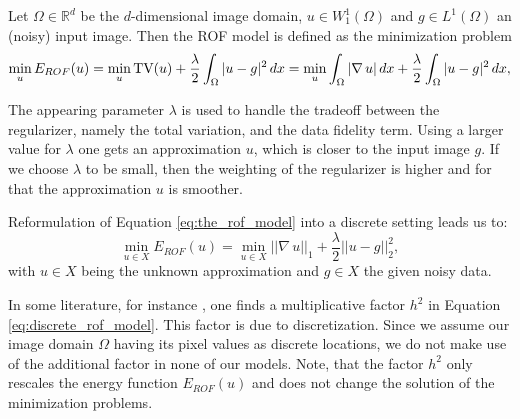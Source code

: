     \begin{definition} %
    \label{def:the_rof_model}

        Let $\Omega \in \mathbb{R}^{d}$ be the $d$-dimensional image domain, $u \in W_{1}^{1}(\Omega)$ and $g \in L^{1}(\Omega)$ an (noisy) input image. Then the ROF model is defined as the minimization problem
            \begin{equation}
                \min_{u} E_{ROF}(u) = \min_{u} \textnormal{TV}(u) + \frac{\lambda}{2} \int_{\Omega} |u - g|^{2} \, dx = \min_{u} \int_{\Omega} |\nabla \, u| \, dx + \frac{\lambda}{2} \int_{\Omega} |u - g|^{2} \, dx,
                \label{eq:the_rof_model}
            \end{equation}

    \end{definition}

    The appearing parameter $\lambda$ is used to handle the tradeoff between the regularizer, namely the total variation, and the data fidelity term. Using a larger value for $\lambda$ one gets an approximation $u$, which is closer to the input image $g$. If we choose $\lambda$ to be small, then the weighting of the regularizer is higher and for that the approximation $u$ is smoother.

    Reformulation of Equation \ref{eq:the_rof_model} into a discrete setting leads us to:
        \begin{equation}
            \min_{u \in X} E_{ROF}(u) = \min_{u \in X} ||\nabla \, u||_{1} + \frac{\lambda}{2} ||u - g||_{2}^{2},
        \label{eq:discrete_rof_model}
        \end{equation}
    with $u \in X$ being the unknown approximation and $g \in X$ the given noisy data.

    \begin{remark} %
        In some literature, for instance \cite{Chambolle10afirst-order}, one finds a multiplicative factor $h^{2}$ in Equation \ref{eq:discrete_rof_model}. This factor is due to discretization. Since we assume our image domain $\Omega$ having its pixel values as discrete locations, we do not make use of the additional factor in none of our models. Note, that the factor $h^{2}$ only rescales the energy function $E_{ROF}(u)$ and does not change the solution of the minimization problems.
    \end{remark}

